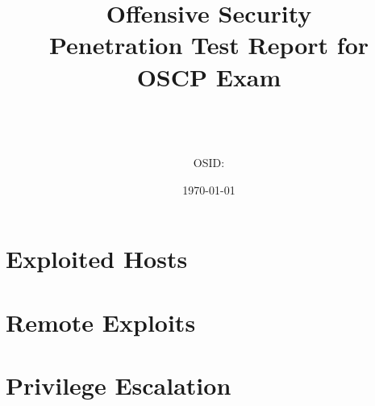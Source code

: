 \documentclass[a4paper, 10pt oneside]{article}
\title{{\textbf{\Huge Offensive Security}}\\ Penetration Test Report for\\OSCP Exam}
\author{\vspace{3cm}\\{\LARGE \name}\\[1em]\email\\[1em]OSID: \osid}
\date{\vspace{7cm}\today}
\begin{document}
\maketitle
\thispagestyle{empty}
\pagebreak
\setcounter{tocdepth}{2}
\tableofcontents
\pagebreak

\pagebreak
\pagebreak

\pagebreak
\section{Exploited Hosts}
\pagebreak

\pagebreak
\appendix
\section{Remote Exploits}
\pagebreak

\section{Privilege Escalation}
\pagebreak
\end{document}
